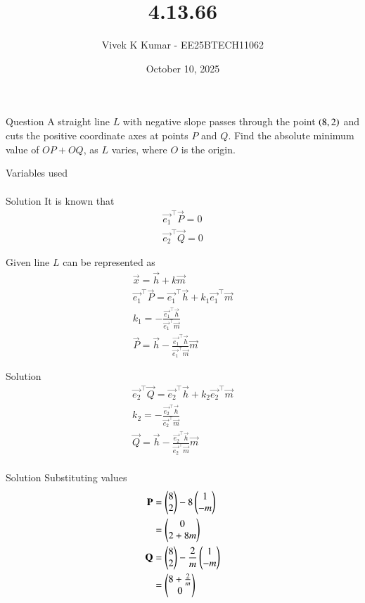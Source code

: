 \documentclass{beamer}
\title 
{4.13.66}
\date{October 10, 2025}
\author 
{Vivek K Kumar - EE25BTECH11062}
\begin{document}
\frame{\titlepage}
\begin{frame}{Question}
A straight line $L$ with negative slope passes through the point $\left(8, 2\right)$ and cuts the
positive coordinate axes at points $P$ and $Q$. Find the absolute minimum value of
$OP + OQ$, as $L$ varies, where $O$ is the origin.
\end{frame}

\begin{frame}{Variables used}
\begin{align}
\end{align}
\begin{table}[H]    
  \centering
  
  \caption{Variables used}
  \label{tab:4.13.66}
\end{table}

\end{frame}

\begin{frame}{Solution}
It is known that 
\begin{align}
    \vec{e_1}^\top\vec{P} = 0 \\
    \vec{e_2}^\top\vec{Q} = 0
\end{align}

Given line $L$ can be represented as 
\begin{align}
    \vec{x} = \vec{h} + k\vec{m} \\
    \vec{e_1}^\top\vec{P} = \vec{e_1}^\top\vec{h} + k_1\vec{e_1}^\top\vec{m} \\
    k_1 = -\frac{\vec{e_1}^\top\vec{h}}{\vec{e_1}^\top\vec{m}} \\
    \vec{P} = \vec{h} - \frac{\vec{e_1}^\top\vec{h}}{\vec{e_1}^\top\vec{m}}\vec{m}
\end{align}
\end{frame}
\begin{frame}{Solution}
\begin{align}
\vec{e_2}^\top\vec{Q} = \vec{e_2}^\top\vec{h} + k_2\vec{e_2}^\top\vec{m} \\
k_2 = -\frac{\vec{e_2}^\top\vec{h}}{\vec{e_2}^\top\vec{m}} \\
\vec{Q} = \vec{h} - \frac{\vec{e_2}^\top\vec{h}}{\vec{e_2}^\top\vec{m}}\vec{m} \\
\end{align}
\end{frame}

\begin{frame}{Solution}
Substituting values
\begin{align}
    \mathbf{P} &= \begin{pmatrix}8 \\ 2\end{pmatrix} - 8\begin{pmatrix}1 \\ -m\end{pmatrix} \\
            &= \begin{pmatrix}0 \\ 2+8m\end{pmatrix} \\
    \mathbf{Q} &= \begin{pmatrix}8 \\ 2\end{pmatrix} - \frac{2}{m}\begin{pmatrix}1 \\ -m\end{pmatrix} \\
            &= \begin{pmatrix}8 + \frac{2}{m} \\ 0\end{pmatrix}
\end{align}
\end{frame}
\end{document}
